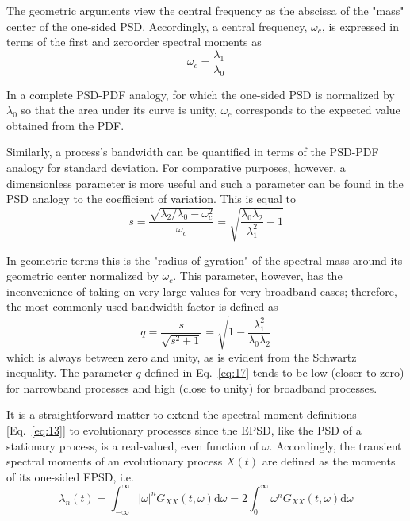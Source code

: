 \documentclass[12pt]{article}
\begin{document}
The geometric arguments view the central frequency as the abscissa of the "mass" center of the one-sided PSD. Accordingly, a central frequency, $\omega_{c}$, is expressed in terms of the first and zeroorder spectral moments as
\begin{equation}
\omega_{c}=\frac{\lambda_{1}}{\lambda_{0}}
\label{eq:15}
\end{equation}

In a complete PSD-PDF analogy, for which the one-sided PSD is normalized by $\lambda_{0}$ so that the area under its curve is unity, $\omega_{c}$ corresponds to the expected value obtained from the PDF.

Similarly, a process's bandwidth can be quantified in terms of the PSD-PDF analogy for standard deviation. For comparative purposes, however, a dimensionless parameter is more useful and such a parameter can be found in the PSD analogy to the coefficient of variation. This is equal to
\begin{equation}
s=\frac{\sqrt{\lambda_{2} / \lambda_{0}-\omega_{c}^{2}}}{\omega_{c}}=\sqrt{\frac{\lambda_{0} \lambda_{2}}{\lambda_{1}^{2}}-1}
\label{eq:16}
\end{equation}

In geometric terms this is the "radius of gyration" of the spectral mass around its geometric center normalized by $\omega_{c}$. This parameter, however, has the inconvenience of taking on very large values for very broadband cases; therefore, the most commonly used bandwidth factor is defined as
\begin{equation}
q=\frac{s}{\sqrt{s^{2}+1}}=\sqrt{1-\frac{\lambda_{1}^{2}}{\lambda_{0} \lambda_{2}}}
\label{eq:17}
\end{equation}
which is always between zero and unity, as is evident from the Schwartz inequality. The parameter $q$ defined in Eq.~\eqref{eq:17} tends to be low (closer to zero) for narrowband processes and high (close to unity) for broadband processes.

It is a straightforward matter to extend the spectral moment definitions [Eq.~\eqref{eq:13}] to evolutionary processes since the EPSD, like the PSD of a stationary process, is a real-valued, even function of $\omega$. Accordingly, the transient spectral moments of an evolutionary process $X(t)$ are defined as the moments of its one-sided EPSD, i.e.
\begin{equation}
\lambda_{n}(t)=\int_{-\infty}^{\infty}|\omega|^{n} G_{X X}(t, \omega) \mathrm{d} \omega=2 \int_{0}^{\infty} \omega^{n} G_{X X}(t, \omega) \mathrm{d} \omega
\label{eq:18}
\end{equation}
\end{document}
